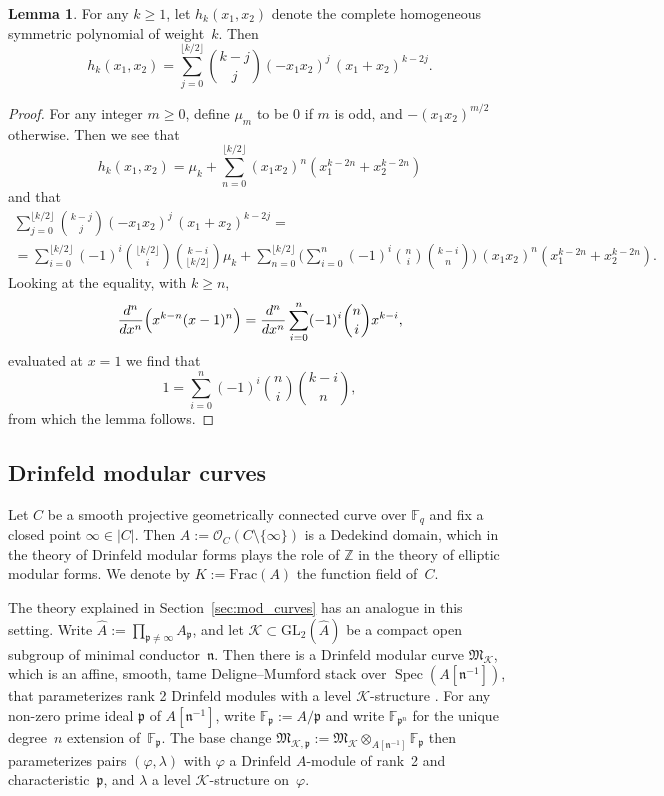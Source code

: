 \documentclass[10pt]{article}
\theoremstyle{definition}
\newtheorem{lemma}[theorem]{Lemma}
\let\phi\varphi
\DeclareMathOperator\Spec{Spec}
\renewcommand{\:}{\colon}
\begin{document}
\begin{lemma} \label{lemma-hformula} For any $k \geq 1$, let $h_k(x_1,x_2)$ denote the complete homogeneous symmetric polynomial of weight~$k$. Then 
$$
h_k(x_1,x_2)=
\sum_{j=0}^{\lfloor k/2 \rfloor} \binom{k-j}{j} (-x_1 x_2)^j \, (x_1+x_2)^{k-2j}. 
$$
\end{lemma}
\begin{proof} For any integer $m \geq 0$, define $\mu_m$ to be 0 if $m$ is odd, and $-(x_1x_2)^{m/2}$ otherwise. Then we see that
$$
h_k(x_1,x_2)= \mu_k + \sum_{n=0}^{\lfloor k/2 \rfloor} (x_1x_2)^n(x_1^{k-2n} + x_2^{k-2n})
$$ 
and that
\begin{multline*}
\sum_{j=0}^{\lfloor k/2 \rfloor} \binom{k-j}{j}(-x_1 x_2)^j \, (x_1 + x_2)^{k-2j}=\\
=\sum_{i=0}^{\lfloor k/2 \rfloor} (-1)^i \binom{\lfloor k/2 \rfloor}{i}\binom{k-i}{ \lfloor k/2 \rfloor} \mu_k + \sum_{n=0}^{\lfloor k/2 \rfloor} \biggl( \sum_{i=0}^{n}  (-1)^i  \binom{n}{i}\binom{k-i}{n} \biggr) \, (x_1x_2)^n(x_1^{k-2n} + x_2^{k-2n}).
\end{multline*}
Looking at the equality, with $k \geq n$, 
$$\frac{d^n}{dx^n} \Bigl(x^{k-n}(x-1)^n\Bigr)=\frac{d^n}{dx^n} \sum_{i=0}^n (-1)^i \binom{n}{i} x^{k-i},
$$
evaluated at $x=1$ we find that 
$$1=\sum_{i=0}^n (-1)^i \binom{n}{i}\binom{k-i}{n}, 
$$
from which the lemma follows. 
\end{proof}


\subsection{Drinfeld modular curves}\label{sec:drinf_modcurves}
Let $C$ be a smooth projective geometrically connected curve over $\mathbb F_q$ and fix a closed point $\infty \in |C|$. Then $A := \mathcal O_{C}(C \setminus \{\infty\})$ is a Dedekind domain, which in the theory of Drinfeld modular forms plays the role of $\mathbb Z$ in the theory of elliptic modular forms. We denote by $K := \mathrm{Frac}(A)$ the function field of~$C$.

The theory explained in Section~\ref{sec:mod_curves} has an analogue in this setting. Write $\hat{A} := \prod_{\mathfrak p \neq \infty} A_{\mathfrak p}$, and let $\mathcal{K} \subset \mathrm{GL}_2(\hat{A})$ be a compact open subgroup of minimal conductor~$\mathfrak n$.
Then there is a Drinfeld modular curve $\mathfrak M_{\mathcal K}$, which is an affine, smooth, tame Deligne--Mumford stack over $\Spec(A[\mathfrak n^{-1}])$, that parameterizes rank 2 Drinfeld modules with a level ${\mathcal K}$-structure \cite{bockle,devries_ramanujan}. For any non-zero prime ideal $\mathfrak p$ of $A[\mathfrak n^{-1}]$, write $\mathbb F_{\mathfrak p} := A/\mathfrak p$ and write $\mathbb F_{\mathfrak p^n}$ for the unique degree~$n$ extension of~$\mathbb F_{\mathfrak p}$. The base change $\mathfrak M_{{\mathcal K},\mathfrak p} := \mathfrak M_{{\mathcal K}} \otimes_{A[\mathfrak n^{-1}]} \mathbb F_{\mathfrak p}$ then parameterizes pairs $(\phi,\lambda)$ with $\phi$ a Drinfeld $A$-module of rank~2 and characteristic~$\mathfrak p$, and $\lambda$ a level ${\mathcal K}$-structure on~$\phi$.
\end{document}
